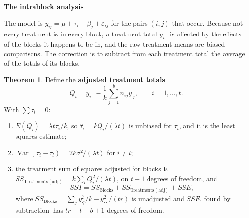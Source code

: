 \documentclass[11pt,a4paper]{article}
\numberwithin{equation}{section}
\DeclareMathOperator{\Var}{Var}
\theoremstyle{definition}
\newtheorem{thm}{Theorem}[subsection]
\newcommand{\subhead}[1]{%
  \par\medskip\noindent\textbf{#1}\par\nobreak\smallskip}
\begin{document}
\subhead{The intrablock analysis}
The model is $y_{ij} = \mu + \tau_i + \beta_j + \varepsilon_{ij}$ for the pairs $(i, j)$ that occur. Because not every treatment is in every block, a treatment total $y_{i\cdot}$ is
affected by the effects of the blocks it happens to be in, and the raw treatment means are biased comparisons. The correction is to subtract
from each treatment total the average of the totals of its blocks.

\begin{thm}\label{thm:bibd}
Define the \textbf{adjusted treatment totals}
\[
Q_i = y_{i\cdot} - \frac1k\sum_{j=1}^bn_{ij}y_{\cdot j} , \qquad i = 1, \dots, t .
\]
With $\sum\tau_i = 0$:
\begin{enumerate}[label=(\roman*)]
\item $E(Q_i) = \lambda t\tau_i/k$, so $\hat\tau_i = kQ_i/(\lambda t)$ is unbiased for $\tau_i$, and it is the least squares estimate;
\item $\Var(\hat\tau_i - \hat\tau_l) = 2k\sigma^2/(\lambda t)$ for $i \ne l$;
\item the treatment sum of squares adjusted for blocks is $SS_{\mathrm{Treatments(adj)}} = k\sum_iQ_i^2/(\lambda t)$, on $t - 1$ degrees of freedom, and
\[
SST = SS_{\mathrm{Blocks}} + SS_{\mathrm{Treatments(adj)}} + SSE ,
\]
where $SS_{\mathrm{Blocks}} = \sum_jy_{\cdot j}^2/k - y_{\cdot\cdot}^2/(tr)$ is unadjusted and $SSE$, found by subtraction, has $tr - t - b + 1$ degrees of freedom.
\end{enumerate}
\end{thm}
\end{document}
